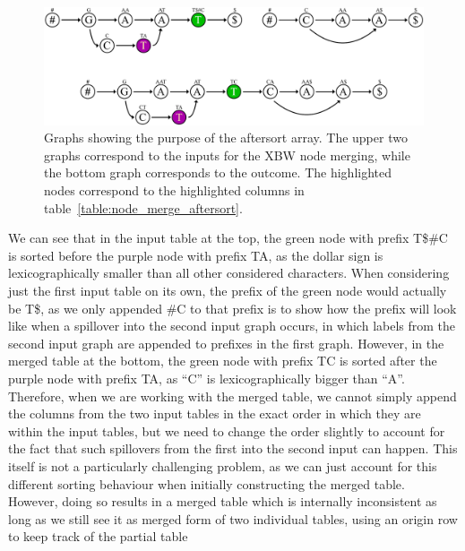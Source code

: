 \documentclass[a4paper,12pt,twoside,BCOR=10mm]{scrbook}
\begin{document}
\begin{figure}[!htb]
\centering
\includegraphics[width=\textwidth]{evo_fig_node_merge_aftersort.pdf}
\caption[Graphs showing purpose of aftersort array]{Graphs showing the purpose of the aftersort array. The upper two graphs correspond to the inputs for the XBW node merging, while the bottom graph corresponds to the outcome. The highlighted nodes correspond to the highlighted columns in table~\ref{table:node_merge_aftersort}.} \label{fig:evo_fig_node_merge_aftersort}
\end{figure}
We can see that in the input table at the top, the green node with prefix T\$$\#$C is sorted 
before the purple node with prefix TA, 
as the dollar sign is lexicographically smaller 
than all other considered characters. 
When considering just the first input table on its own, the prefix of the green node would actually be T\$, 
as we only appended $\#$C to that prefix is to show 
how the prefix will look like when a spillover into the second input graph occurs, in which labels from the 
second input graph are appended to prefixes in the first graph. 
However, in the merged table at the bottom, the green node with prefix TC is sorted after the purple node with prefix TA, 
as “C” is lexicographically bigger than “A”. \\
Therefore, when we are working with the merged table, we cannot simply append the columns from the two input 
tables in the exact order in which they are within the input tables, but we need to change the order slightly 
to account for the fact that such spillovers from the first into the second input can happen. 
This itself is not a particularly challenging problem, as we can just account for this different sorting 
behaviour when initially constructing the merged table. \\
However, doing so results in a merged table which is internally inconsistent as long as we still 
see it as merged form of two individual tables, using an origin row to keep track of the partial table 
\end{document}
